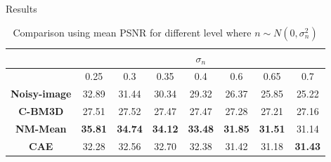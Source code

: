 \documentclass{libs/ufc_format}
\begin{document}
\begin{frame}{Results}
\begin{itemize}
{{                  \begin{table}[h]
                      \centering
                      \caption{Comparison using mean PSNR for different level where $n \sim N(0, \sigma^2_n)$}
                      \label{psnrcom}
                      \begin{adjustbox}{width=0.8\textwidth}
                      \begin{tabular}{|c|c|c|c|c|c|c|c|}
                          \hline
                                               & \multicolumn{7}{c|}{\textbf{$\sigma_n$}}                                                                                                       \\ \hline
                                               & 0.25                                     & 0.3            & 0.35           & 0.4            & 0.6            & 0.65           & 0.7            \\ \hline
                          \textbf{Noisy-image} & 32.89                                    & 31.44          & 30.34          & 29.32          & 26.37          & 25.85          & 25.22          \\ \hline
                          \textbf{C-BM3D}      & 27.51                                    & 27.52          & 27.47          & 27.47          & 27.28          & 27.21          & 27.16          \\ \hline
                          \textbf{NM-Mean}     & \textbf{35.81}                           & \textbf{34.74} & \textbf{34.12} & \textbf{33.48} & \textbf{31.85} & \textbf{31.51} & 31.14          \\ \hline
                          \textbf{CAE}         & 32.28                                    & 32.56          & 32.70          & 32.38          & 31.42          & 31.18          & \textbf{31.43} \\ \hline
                      \end{tabular}
                    \end{adjustbox}
                  \end{table}
              }}
                
\end{itemize}
\end{frame}
\end{document}
